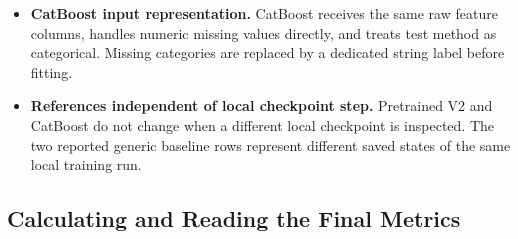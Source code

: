 \documentclass[11pt]{article}
\newenvironment{notes}
  {\begin{itemize}\setlength{\itemsep}{0.45em}\setlength{\parsep}{0pt}}
  {\end{itemize}}
\begin{document}
\begin{notes}
    \item \textbf{CatBoost input representation.}
    CatBoost receives the same raw feature columns, handles
    numeric missing values directly, and treats test method
    as categorical. Missing categories are replaced by a
    dedicated string label before fitting.

    \item \textbf{References independent of local checkpoint step.}
    Pretrained V2 and CatBoost do not change when a different
    local checkpoint is inspected. The two reported generic
    baseline rows represent different saved states of the
    same local training run.
\end{notes}

\subsection{Calculating and Reading the Final Metrics}
\label{sec:final-metrics}
\end{document}
